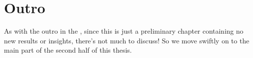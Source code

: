 \section{Outro}

As with the outro in the , since this is just a preliminary chapter containing no new results or insights, there's not much to discuss!
So we move swiftly on to the main part of the second half of this thesis.